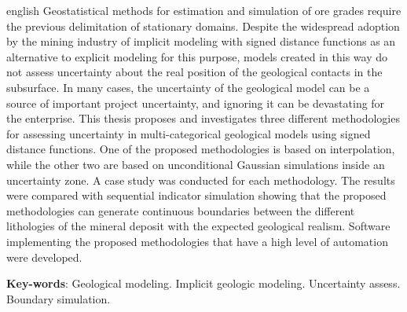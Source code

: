 \documentclass[
    oneside, %
	12pt,				%
	a4paper,			%
	chapter=TITLE,		%
	english,			%
	french,				%
	spanish,			%
	brazil				%
	]{abntex2}
\begin{document}
\begin{resumo}[Abstract]
 \begin{otherlanguage*}{english}
   Geostatistical methods for estimation and simulation of ore grades require the previous delimitation of stationary domains. Despite the widespread adoption by the mining industry of implicit modeling with signed distance functions as an alternative to explicit modeling for this purpose, models created in this way do not assess uncertainty about the real position of the geological contacts in the subsurface. In many cases, the uncertainty of the geological model can be a source of important project uncertainty, and ignoring it can be devastating for the enterprise. This thesis proposes and investigates three different methodologies for assessing uncertainty in multi-categorical geological models using signed distance functions. One of the proposed methodologies is based on interpolation, while the other two are based on unconditional Gaussian simulations inside an uncertainty zone. A case study was conducted for each methodology. The results were compared with sequential indicator simulation showing that the proposed methodologies can generate continuous boundaries between the different lithologies of the mineral deposit with the expected geological realism. Software implementing the proposed methodologies that have a high level of automation were developed.

   \vspace{\onelineskip}
 
   \noindent 
   \textbf{Key-words}: Geological modeling. Implicit geologic modeling. Uncertainty assess. Boundary simulation.
 \end{otherlanguage*}
\end{resumo}


\listoffigures*
\cleardoublepage

\tableofcontents*
\cleardoublepage



\textual





\end{document}
